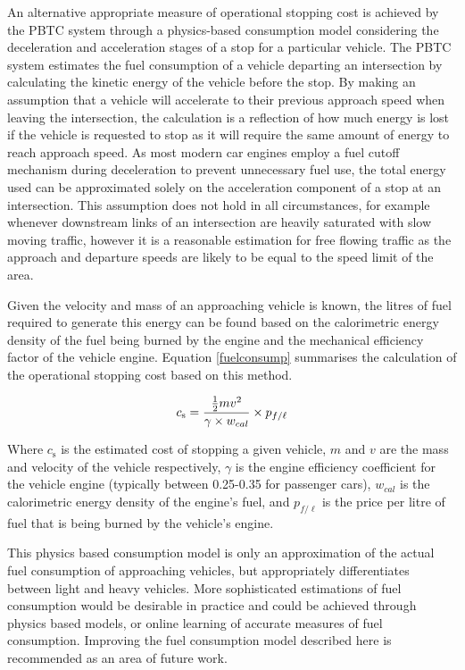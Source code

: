 An alternative appropriate measure of operational stopping cost is achieved by the PBTC system through a physics-based consumption model considering the deceleration and acceleration stages of a stop for a particular vehicle. The PBTC system estimates the fuel consumption of a vehicle departing an intersection by calculating the kinetic energy of the vehicle before the stop. By making an assumption that a vehicle will accelerate to their previous approach speed when leaving the intersection, the calculation is a reflection of how much energy is lost if the vehicle is requested to stop as it will require the same amount of energy to reach approach speed. As most modern car engines employ a fuel cutoff mechanism during deceleration to prevent unnecessary fuel use, the total energy used can be approximated solely on the acceleration component of a stop at an intersection. This assumption does not hold in all circumstances, for example whenever downstream links of an intersection are heavily saturated with slow moving traffic, however it is a reasonable estimation for free flowing traffic as the approach and departure speeds are likely to be equal to the speed limit of the area. 

Given the velocity and mass of an approaching vehicle is known, the litres of fuel required to generate this energy can be found based on the calorimetric energy density of the fuel being burned by the engine and the mechanical efficiency factor of the vehicle engine. Equation \ref{fuelconsump} summarises the calculation of the operational stopping cost based on this method.

\begin{align}
	\centering
		c_\text{s} = {\frac{\frac{1}{2}m{v}^{2} }{\gamma \times w_{cal}}} \times {p_{f\text{/}\ell}}
	\label{fuelconsump}
\end{align}

Where $c_\text{s}$ is the estimated cost of stopping a given vehicle, $m$ and $v$ are the mass and velocity of the vehicle respectively, $\gamma$ is the engine efficiency coefficient for the vehicle engine (typically between 0.25-0.35 for passenger cars), $w_{cal}$ is the calorimetric energy density of the engine's fuel, and $p_{f\text{/}\ell}$ is the price per litre of fuel that is being burned by the vehicle's engine.

This physics based consumption model is only an approximation of the actual fuel consumption of approaching vehicles, but appropriately differentiates between light and heavy vehicles. More sophisticated estimations of fuel consumption would be desirable in practice and could be achieved through physics based models, or online learning of accurate measures of fuel consumption. Improving the fuel consumption model described here is recommended as an area of future work. 

